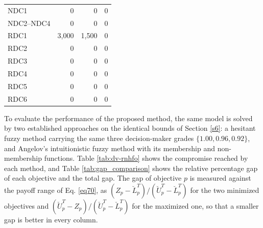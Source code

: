 \documentclass[a4paper]{elsarticle}
\begin{document}
{\begin{table}[h]
\begin{tabular}{lrrr}
\midrule
NDC1 & 0 & 0 & 0 \\
NDC2--NDC4 & 0 & 0 & 0 \\
\midrule
RDC1 & 3,000 & 1,500 & 0 \\
RDC2 & 0 & 0 & 0 \\
RDC3 & 0 & 0 & 0 \\
RDC4 & 0 & 0 & 0 \\
RDC5 & 0 & 0 & 0 \\
RDC6 & 0 & 0 & 0 \\
\bottomrule
\end{tabular}
\end{table}
To evaluate the performance of the proposed method, the same model is solved by two established approaches on the identical bounds of Section \ref{s6}: a hesitant fuzzy method \cite{Bharati:2018} carrying the same three decision-maker grades $\{1.00, 0.96, 0.92\}$, and Angelov's intuitionistic fuzzy method \cite{Angelov:1997} with its membership and non-membership functions. Table \ref{tab:dv-rnhfo} shows the compromise reached by each method, and Table \ref{tab:gap_comparison} shows the relative percentage gap of each objective and the total gap. The gap of objective $p$ is measured against the payoff range of Eq. \ref{eq70}, as $(Z_p - \breve{L}^T_p)/(\breve{U}^T_p-\breve{L}^T_p)$ for the two minimized objectives and $(\breve{U}^T_p - Z_p)/(\breve{U}^T_p-\breve{L}^T_p)$ for the maximized one, so that a smaller gap is better in every column.

}
\end{document}

